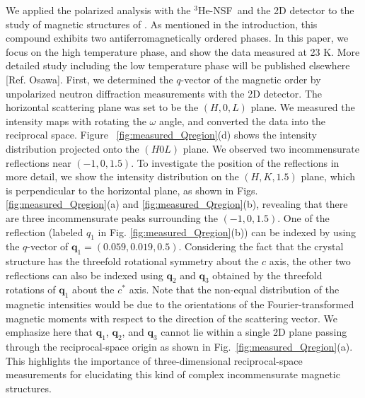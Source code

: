 \documentclass[%
 reprint,
superscriptaddress,
 amsmath,amssymb,
 aps,
floatfix,
]{revtex4-2}
\newcommand{\Hensf}{$^3$He-NSF}
\begin{document}
We applied the polarized analysis with the \Hensf\ and the 2D detector to the study of magnetic structures of  . 
As mentioned in the introduction, this compound exhibits two antiferromagnetically ordered phases. %
In this paper, we focus on the high temperature phase, and show the data measured at 23 K. 
More detailed study including the low temperature phase will be published elsewhere [Ref. Osawa].  
First, we determined the $q$-vector of the magnetic order by unpolarized neutron diffraction measurements with the 2D detector.
The horizontal scattering plane was set to be the $(H,0,L)$ plane. %
We measured the intensity maps with rotating the $\omega$ angle, and converted the data into the reciprocal space. %
Figure ~\ref{fig:measured_Qregion}(d) shows the intensity distribution projected onto the  \((H0L)\) plane. 
We observed two incommensurate reflections near $(-1,0,1.5)$. 
To investigate the position of the reflections in more detail, we show the intensity distribution on the $(H,K,1.5)$ plane, which is perpendicular to the horizontal plane, as shown in Figs. \ref{fig:measured_Qregion}(a) and \ref{fig:measured_Qregion}(b), revealing that there are three incommensurate peaks surrounding the $(-1,0,1.5)$. 
One of the reflection (labeled $q_1$ in Fig. \ref{fig:measured_Qregion}(b)) can be indexed by using the $q$-vector of $\boldsymbol{q}_1 = (0.059, 0.019, 0.5)$. 
Considering the fact that the crystal structure has the threefold rotational symmetry about the $c$ axis, the other two reflections can also be indexed using $\boldsymbol{q}_2$ and $\boldsymbol{q}_3$ obtained by the threefold rotations of $\boldsymbol{q}_1$ about the $c^*$ axis. 
Note that the non-equal distribution of the magnetic intensities would be due to the orientations of the Fourier-transformed magnetic moments with respect to the direction of the scattering vector. 
We emphasize here that $\boldsymbol{q}_1$, $\boldsymbol{q}_2$, and $\boldsymbol{q}_3$ cannot lie within a single 2D plane passing through the reciprocal-space origin as shown in Fig.~\ref{fig:measured_Qregion}(a).
This highlights the importance of three-dimensional reciprocal-space measurements for elucidating this kind of complex incommensurate magnetic structures. %
\end{document}

